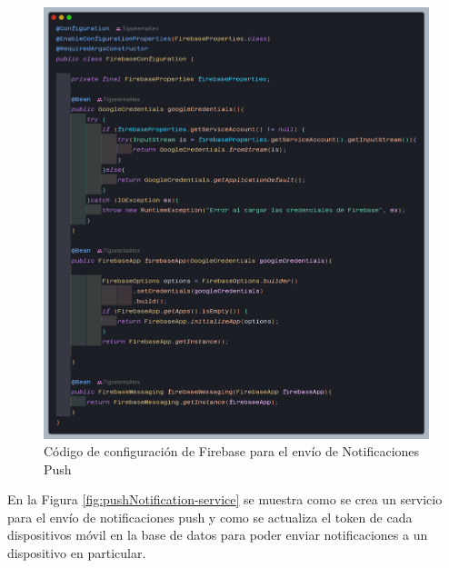 \begin{figure}[H]
    \centering
    \includegraphics[width=1\textwidth]{resources/images/firebase}
    \caption{Código de configuración de Firebase para el envío de Notificaciones Push}
    \label{fig:firebase}
\end{figure}

En la Figura \ref{fig:pushNotification-service} se muestra como se crea un servicio para el envío de notificaciones push y como se actualiza  el token de cada dispositivos móvil en la base de datos para poder enviar notificaciones a un dispositivo en particular.

